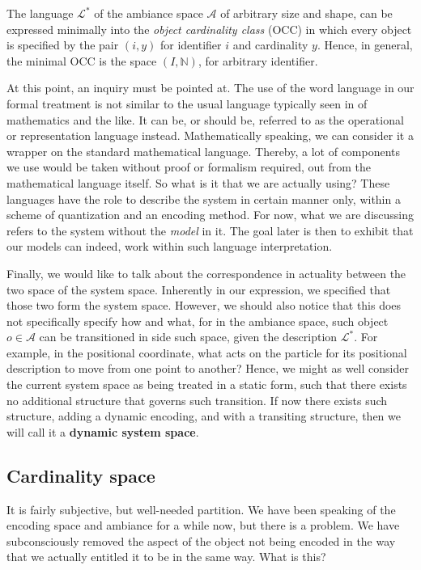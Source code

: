 \begin{definition}
  The language $\mathcal{L}^{*}$ of the ambiance space $\mathcal{A}$ of arbitrary size and shape, can be expressed minimally into the \textit{object cardinality class} (OCC) in which every object is specified by the pair $(i,y)$ for identifier $i$ and cardinality $y$. Hence, in general, the minimal OCC is the space $(I,\mathbb{N})$, for arbitrary identifier.
\end{definition}

At this point, an inquiry must be pointed at. The use of the word language in our formal treatment is not similar to the usual language typically seen in of mathematics and the like. It can be, or should be, referred to as the operational or representation language instead. Mathematically speaking, we can consider it a wrapper on the standard mathematical language. Thereby, a lot of components we use would be taken without proof or formalism required, out from the mathematical language itself. So what is it that we are actually using? These languages have the role to describe the system in certain manner only, within a scheme of quantization and an encoding method. For now, what we are discussing refers to the system without the \textit{model} in it. The goal later is then to exhibit that our models can indeed, work within such language interpretation. 

Finally, we would like to talk about the correspondence in actuality between the two space of the system space. Inherently in our expression, we specified that those two form the system space. However, we should also notice that this does not specifically specify how and what, for in the ambiance space, such object $o\in \mathcal{A}$ can be transitioned in side such space, given the description $\mathcal{L}^{*}$. For example, in the positional coordinate, what acts on the particle for its positional description to move from one point to another? Hence, we might as well consider the current system space as being treated in a static form, such that there exists no additional structure that governs such transition. If now there exists such structure, adding a dynamic encoding, and with a transiting structure, then we will call it a \textbf{dynamic system space}.

\subsection{Cardinality space}

It is fairly subjective, but well-needed partition. We have been speaking of the encoding space and ambiance for a while now, but there is a problem. We have subconsciously removed the aspect of the object not being encoded in the way that we actually entitled it to be in the same way. What is this? 

